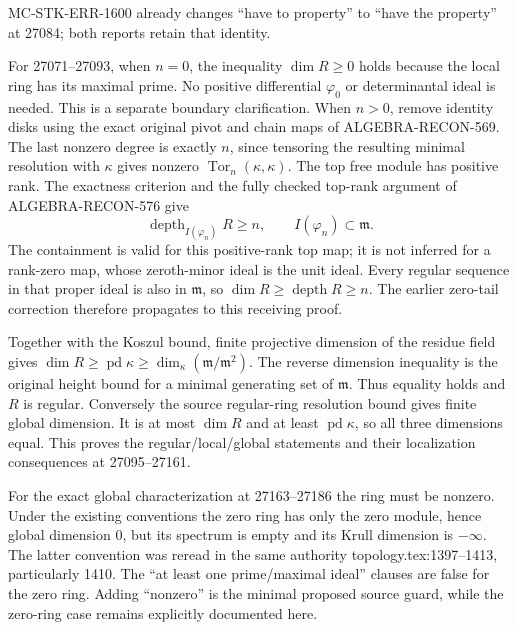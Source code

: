 MC-\AlgebraIdentifierBreak{}STK-\AlgebraIdentifierBreak{}ERR-\AlgebraIdentifierBreak{}1600 already changes ``have to property'' to ``have the property'' at 27084; both reports retain that identity.

For 27071--27093, when \(n=0\), the inequality \(\dim R\ge0\) holds because the local ring has its maximal prime. No positive differential \(\varphi_0\) or determinantal ideal is needed. This is a separate boundary clarification. When \(n>0\), remove identity disks using the exact original pivot and chain maps of ALGEBRA-\AlgebraIdentifierBreak{}RECON-\AlgebraIdentifierBreak{}569. The last nonzero degree is exactly \(n\), since tensoring the resulting minimal resolution with \(\kappa\) gives nonzero \(\operatorname{Tor}_n(\kappa,\kappa)\). The top free module has positive rank. The exactness criterion and the fully checked top-rank argument of ALGEBRA-\AlgebraIdentifierBreak{}RECON-\AlgebraIdentifierBreak{}576 give \[
\operatorname{depth}_{I(\varphi_n)}R\ge n,\qquad
I(\varphi_n)\subset\mathfrak m .
\] The containment is valid for this positive-rank top map; it is not inferred for a rank-zero map, whose zeroth-minor ideal is the unit ideal. Every regular sequence in that proper ideal is also in \(\mathfrak m\), so \(\dim R\ge\operatorname{depth}R\ge n\). The earlier zero-tail correction therefore propagates to this receiving proof.

Together with the Koszul bound, finite projective dimension of the residue field gives \(\dim R\ge\operatorname{pd}\kappa\ge\dim_\kappa(\mathfrak m/\mathfrak m^2)\). The reverse dimension inequality is the original height bound for a minimal generating set of \(\mathfrak m\). Thus equality holds and \(R\) is regular. Conversely the source regular-ring resolution bound gives finite global dimension. It is at most \(\dim R\) and at least \(\operatorname{pd}\kappa\), so all three dimensions equal. This proves the regular/local/global statements and their localization consequences at 27095--27161.

For the exact global characterization at 27163--27186 the ring must be nonzero. Under the existing conventions the zero ring has only the zero module, hence global dimension 0, but its spectrum is empty and its Krull dimension is \(-\infty\). The latter convention was reread in the same authority topology.\AlgebraIdentifierBreak{}tex:\AlgebraIdentifierBreak{}1397--\AlgebraIdentifierBreak{}1413, particularly 1410. The ``at least one prime/maximal ideal'' clauses are false for the zero ring. Adding ``nonzero'' is the minimal proposed source guard, while the zero-ring case remains explicitly documented here.

